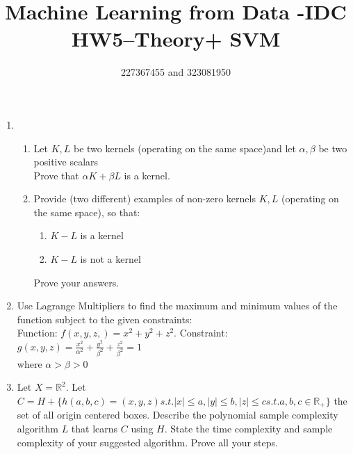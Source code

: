 \documentclass[12pt]{article}
\title{Machine Learning from Data -IDC\\HW5–Theory+ SVM}
\author{227367455 and 323081950}
\begin{document}
\maketitle

\begin{enumerate}
	\item  \hspace{1cm}
	\begin{enumerate}
		\item Let $K,L$ be two kernels (operating on the same space)and let $ \alpha, \beta $ be two positive scalars \\
		Prove that $\alpha K + \beta L $ is a kernel.
		\item Provide (two different) examples of non-zero kernels $K,L$ (operating on the same space), so that:
		\begin{enumerate}
			\item $K - L$ is a kernel
			\item $K - L$ is not a kernel
		\end{enumerate}
		Prove your answers.
	\end{enumerate}
	\item Use Lagrange Multipliers to find the maximum and minimum values of the function subject to the given constraints: \\
	Function: $f(x,y,z,) = x^2 + y^2 + z^2$. Constraint: $g(x,y,z) = \frac{x^2}{\alpha^2} + \frac{y^2}{\beta^2} + \frac{z^2}{\beta^2} = 1$ \\
	where $ \alpha > \beta > 0$
	\item Let $X = \mathbb{R}^2$. Let $ C = H + \{h(a,b,c) = {(x,y,z) s.t. |x| \leq a, |y| \leq b, |z| \leq c} s.t. a,b,c \in \mathbb{R}_+\}$ the set of all origin centered boxes. Describe the polynomial sample complexity algorithm $L$ that learns $C$ using $H$. State the time complexity and sample complexity of your suggested algorithm. Prove all your steps.
\end{enumerate}
\end{document}
